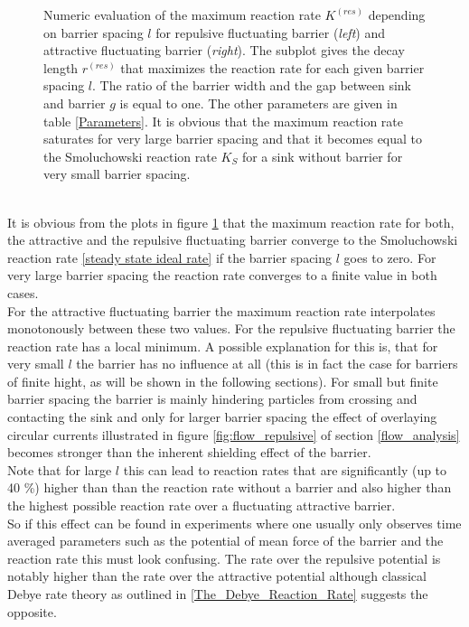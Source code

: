 \begin{minipage}[t]{1 \textwidth}
    \begin{figure}[H]
        \caption{Numeric evaluation of the maximum reaction rate $K^{(res)}$ depending on barrier spacing $l$ for repulsive fluctuating barrier (\emph{left}) and attractive fluctuating barrier (\emph{right}). The subplot gives the decay length $r^{(res)}$ that maximizes the reaction rate for each given barrier spacing $l$. The ratio of the barrier width and the gap between sink and barrier $g$ is equal to one. The other parameters are given in table \ref{Parameters}. It is obvious that the maximum reaction rate saturates for very large barrier spacing and that it becomes equal to the Smoluchowski reaction rate $K_S$ for a sink without barrier for very small barrier spacing. \label{fig:res_l}}
    \end{figure}
\end{minipage} \vspace{0.5 cm} \\

It is obvious from the plots in figure \ref{fig:res_l} that the maximum reaction rate for both, the attractive and the repulsive fluctuating barrier converge to the Smoluchowski reaction rate \eqref{steady state ideal rate} if the barrier spacing $l$ goes to zero. For very large barrier spacing the reaction rate converges to a finite value in both cases. \\
For the attractive fluctuating barrier the maximum reaction rate interpolates monotonously between these two values. For the repulsive fluctuating barrier the reaction rate has a local minimum. A possible explanation for this is, that for very small $l$ the barrier has no influence at all (this is in fact the case for barriers of finite hight, as will be shown in the following sections). For small but finite barrier spacing the barrier is mainly hindering particles from crossing and contacting the sink and only for larger barrier spacing the effect of overlaying circular currents illustrated in figure \ref{fig:flow_repulsive} of section \ref{flow_analysis} becomes stronger than the inherent shielding effect of the barrier.\\
Note that for large $l$ this can lead to reaction rates that are significantly (up to 40 \%) higher than than the reaction rate without a barrier and also higher than the highest possible reaction rate over a fluctuating attractive barrier.\\
So if this effect can be found in experiments where one usually only observes time averaged parameters such as the potential of mean force of the barrier and the reaction rate this must look confusing. The rate over the repulsive potential is notably higher than the rate over the attractive potential although classical Debye rate theory as outlined in \ref{The_Debye_Reaction_Rate} suggests the opposite.

